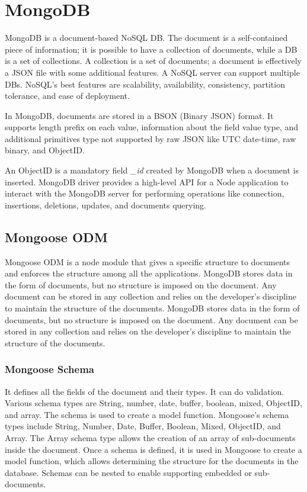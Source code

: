 \section*{MongoDB}

MongoDB is a document-based NoSQL DB. The document is a self-contained piece of information; it is possible to have a collection of documents, while a DB is a set of collections. A collection is a set of documents; a document is effectively a JSON file with some additional features. 
A NoSQL server can support multiple DBs. 
NoSQL's best features are scalability, availability, consistency, partition tolerance, and ease of deployment.

In MongoDB, documents are stored in a BSON (Binary JSON) format. It supports length prefix on each value, information about the field value type, and additional primitives type not supported by raw JSON like UTC date-time, raw binary, and ObjectID.

An ObjectID is a mandatory field \textit{\_id} created by MongoDB when a document is inserted.
MongoDB driver provides a high-level API for a Node application to interact with the MongoDB server for performing operations like connection, insertions, deletions, updates, and documents querying.

\subsection*{Mongoose ODM}
Mongoose ODM is a node module that gives a specific structure to documents and enforces the structure among all the applications. MongoDB stores data in the form of documents, but no structure is imposed on the document. Any document can be stored in any collection and relies on the developer's discipline to maintain the structure of the documents. MongoDB stores data in the form of documents, but no structure is imposed on the document. Any document can be stored in any collection and relies on the developer's discipline to maintain the structure of the documents.

\subsubsection*{Mongoose Schema}
It defines all the fields of the document and their types. It can do validation. Various schema types are String, number, date, buffer, boolean, mixed, ObjectID, and array. The schema is used to create a model function. Mongoose's schema types include String, Number, Date, Buffer, Boolean, Mixed, ObjectID, and Array. The Array schema type allows the creation of an array of sub-documents inside the document. Once a schema is defined, it is used in Mongoose to create a model function, which allows determining the structure for the documents in the database. Schemas can be nested to enable supporting embedded or sub-documents. 

